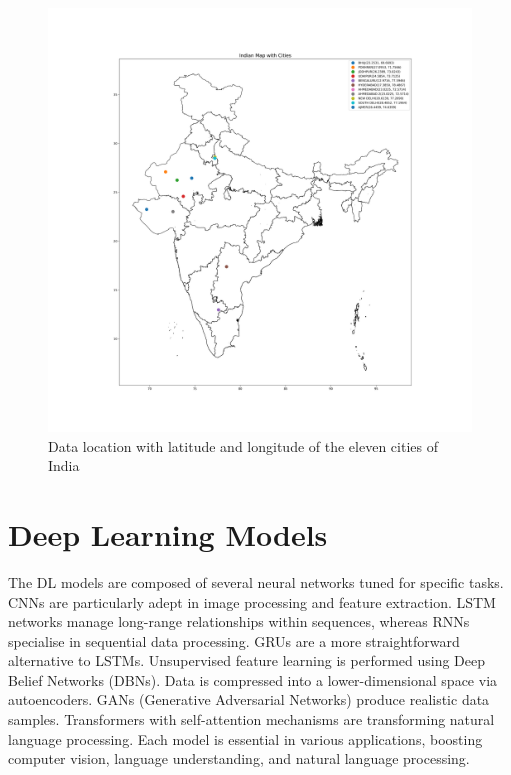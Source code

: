 \documentclass[a4paper,fleqn]{cas-sc}
\begin{document}
\begin{figure}[!ht]
\centering
\includegraphics[width=\textwidth]{AMod India_Map}
\caption{Data location with latitude and longitude of the eleven cities of India }
\label{Figure 1}
\end{figure}



\section{Deep Learning Models}
The DL models are composed of several neural networks tuned for specific tasks. CNNs are particularly adept in image processing and feature extraction. LSTM networks manage long-range relationships within sequences, whereas RNNs specialise in sequential data processing. GRUs are a more straightforward alternative to LSTMs. Unsupervised feature learning is performed using Deep Belief Networks (DBNs). Data is compressed into a lower-dimensional space via autoencoders. GANs (Generative Adversarial Networks) produce realistic data samples. Transformers with self-attention mechanisms are transforming natural language processing. Each model is essential in various applications, boosting computer vision, language understanding, and natural language processing.
\end{document}
